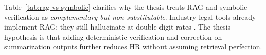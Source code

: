 Table~\ref{tab:rag-vs-symbolic} clarifies why the thesis treats RAG and symbolic verification as \emph{complementary but non-substitutable}. Industry legal tools already implement RAG; they still hallucinate at double-digit rates \cite{magesh2025hallucinationfree}. The thesis hypothesis is that adding deterministic verification and correction on summarization outputs further reduces HR without assuming retrieval perfection.
